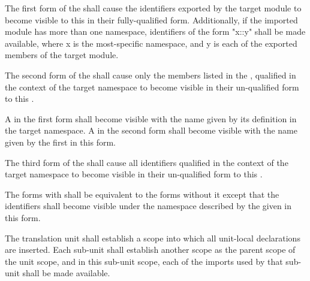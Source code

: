 \specsubitem
The first form of the  shall cause the identifiers
exported by the target module to become visible to this 
in their fully-qualified form. Additionally, if the imported module has more
than one namespace, identifiers of the form "x::y" shall be made available,
where x is the most-specific namespace, and y is each of the exported members
of the target module.

\specsubitem
The second form of the  shall cause only the members
listed in the , qualified in the context of the target
namespace to become visible in their un-qualified form to this
.

\specsubitem
A  in the first form shall become visible with the name
given by its definition in the target namespace. A  in the
second form shall become visible with the name given by the first
 in this form.


\specsubitem
The third form of the  shall cause all identifiers
qualified in the context of the target namespace to become visible in their
un-qualified form to this .

\specsubitem
The forms with  shall be equivalent to the forms without
it except that the identifiers shall become visible under the namespace
described by the  given in this form.


\specsubitem
The translation unit shall establish a scope into which all
unit-local declarations are inserted. Each sub-unit shall establish another
scope as the parent scope of the unit scope, and in this sub-unit
scope, each of the imports used by that sub-unit shall be made available.


